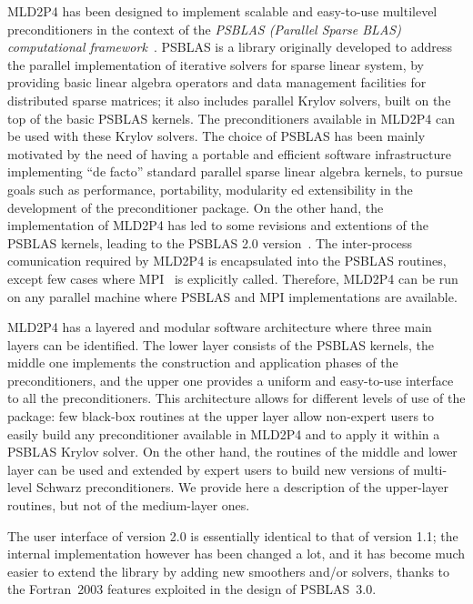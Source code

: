 MLD2P4 has been designed to implement scalable and easy-to-use
multilevel preconditioners in the context of the \emph{PSBLAS
  (Parallel Sparse BLAS) computational framework}~\cite{psblas_00,PSBLAS3}. 
PSBLAS is a library originally developed to address the parallel implementation of
iterative solvers for sparse linear system, by providing basic linear algebra
operators and data management facilities for distributed sparse matrices; it
also includes parallel Krylov solvers, built on the top of the basic PSBLAS kernels.
The preconditioners available in MLD2P4 can be used with these Krylov solvers.
The choice of PSBLAS has been mainly motivated by the need of having
a portable and efficient software infrastructure implementing ``de facto'' standard
parallel sparse linear algebra kernels, to pursue goals such as performance,
portability, modularity ed extensibility in the development of the preconditioner
package. On the other hand, the implementation of MLD2P4 has led to some
revisions and extentions of the PSBLAS kernels, leading to the
 PSBLAS 2.0 version~\cite{PSBLASGUIDE}. The inter-process comunication required
by MLD2P4 is encapsulated into the PSBLAS routines, except few cases where
MPI~\cite{MPI1} is explicitly called. Therefore, MLD2P4 can be run on any parallel
machine where PSBLAS and MPI implementations are available.

MLD2P4 has a layered and modular software architecture where three main layers can be identified. 
The lower layer consists of the PSBLAS kernels, the middle one implements
the construction and application phases of the preconditioners, and the upper one
provides a uniform and easy-to-use interface to all the preconditioners. 
This architecture allows for different levels of use of the package:
few black-box routines at the upper layer allow non-expert users to easily
build any preconditioner available in MLD2P4 and to apply it within a PSBLAS Krylov solver.
On the other hand, the routines of the middle and lower layer can be used and extended
by expert users to build new versions of multi-level Schwarz preconditioners.
We provide here a description of the upper-layer routines, but not of the
medium-layer ones.%

The user interface of version 2.0 is essentially identical to that of
version 1.1; the internal implementation however has been changed a
lot, and it has become much easier to extend the library by adding new
smoothers and/or solvers, thanks to the Fortran~2003 features
exploited in the design of PSBLAS~3.0. 

